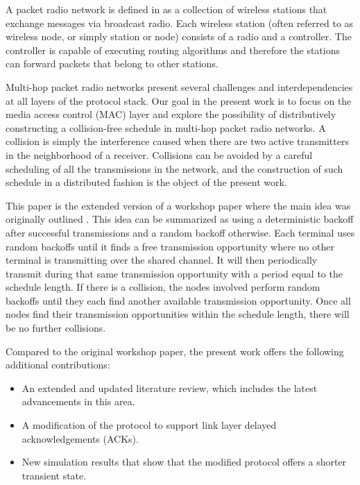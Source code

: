 \documentclass[twocolumn]{svjour3}          \smartqed  \usepackage{graphicx}
\begin{document}
A packet radio network is defined in \cite{tobagi1987mpa} as a collection of wireless stations that exchange messages via broadcast radio.
Each wireless station (often referred to as wireless node, or simply station or node) consists of a radio and a controller.
The controller is capable of executing routing algorithms and therefore the stations can forward packets that belong to other stations.

Multi-hop packet radio networks present several challenges and interdependencies at all layers of the protocol stack.
Our goal in the present work is to focus on the media access control (MAC) layer and explore the possibility of distributively constructing a collision-free schedule in multi-hop packet radio networks.
A collision is simply the interference caused when there are two active transmitters in the neighborhood of a receiver.
Collisions can be avoided by a careful scheduling of all the transmissions in the network, and the construction of such schedule in a distributed fashion is the object of the present work.

This paper is the extended version of a workshop paper where the main idea was originally outlined \cite{barcelo2011cfo}.
This idea can be summarized as using a deterministic backoff after successful transmissions and a random backoff otherwise.
Each terminal uses random backoffs until it finds a free transmission opportunity where no other terminal is transmitting over the shared channel.
It will then periodically transmit during that same transmission opportunity with a period equal to the schedule length.
If there is a collision, the nodes involved perform random backoffs until they each find another available transmission opportunity.
Once all nodes find their transmission opportunities within the schedule length, there will be no further collisions.

Compared to the original workshop paper, the present work offers the following additional contributions:
\begin{itemize}
\item An extended and updated literature review, which includes the latest advancements in this area.
\item A modification of the protocol to support link layer delayed acknowledgements (ACKs).
\item New simulation results that show that the modified protocol offers a shorter transient state.
\end{itemize}
\end{document}
